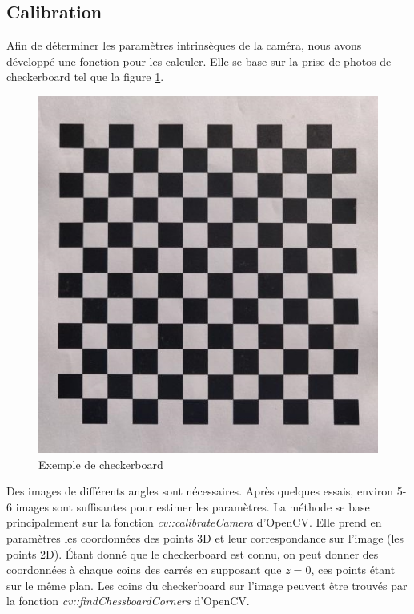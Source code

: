         \subsection{Calibration}
            Afin de déterminer les paramètres intrinsèques de la caméra, nous avons développé une fonction pour les calculer. Elle se base sur la prise de photos de checkerboard tel que la figure \ref{fig:checkerboard}.

            \begin{figure}[!h]
                \centering
                \includegraphics[scale=0.3]{img/rendu/checkerboard.jpg}
                \caption{Exemple de checkerboard}
                \label{fig:checkerboard}
            \end{figure}

            Des images de différents angles sont nécessaires. Après quelques essais, environ 5-6 images sont suffisantes pour estimer les paramètres. La méthode se base principalement sur la fonction \emph{cv::calibrateCamera} d'OpenCV. Elle prend en paramètres les coordonnées des points 3D et leur correspondance sur l'image (les points 2D). Étant donné que le checkerboard est connu, on peut donner des coordonnées à chaque coins des carrés en supposant que $z=0$, ces points étant sur le même plan. Les coins du checkerboard sur l'image peuvent être trouvés par la fonction \emph{cv::findChessboardCorners} d'OpenCV.

